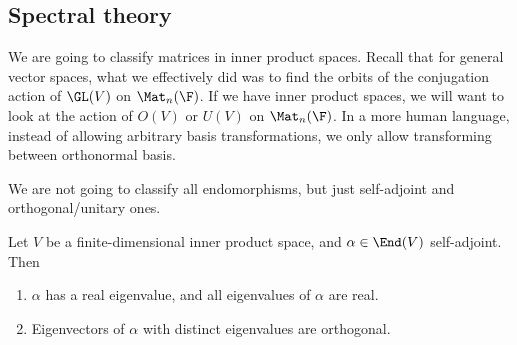 \documentclass[a4paper]{article}
\begin{document}
\subsection{Spectral theory}
We are going to classify matrices in inner product spaces. Recall that for general vector spaces, what we effectively did was to find the orbits of the conjugation action of $\GL(V)$ on $\Mat_n(\F)$. If we have inner product spaces, we will want to look at the action of $O(V)$ or $U(V)$ on $\Mat_n(\F)$. In a more human language, instead of allowing arbitrary basis transformations, we only allow transforming between orthonormal basis.

We are not going to classify all endomorphisms, but just self-adjoint and orthogonal/unitary ones.

\begin{lemma}
  Let $V$ be a finite-dimensional inner product space, and $\alpha \in \End(V)$ self-adjoint. Then
  \begin{enumerate}
    \item $\alpha$ has a real eigenvalue, and all eigenvalues of $\alpha$ are real.
    \item Eigenvectors of $\alpha$ with distinct eigenvalues are orthogonal.
  \end{enumerate}
\end{lemma}
\end{document}
